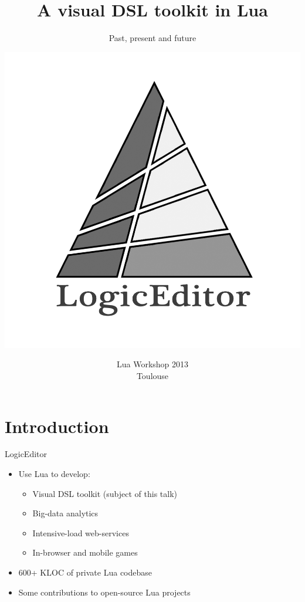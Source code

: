 \documentclass[handout]{beamer}
\title{A visual DSL toolkit in Lua}
\subtitle{Past, present and future}
\author{\includegraphics[height=.4\textheight]{logo}}
\institute{Alexander Gladysh <ag@logiceditor.com>}
\date{Lua Workshop 2013\\Toulouse}
\begin{document}
\maketitle



\section{Introduction}



\begin{frame}{LogicEditor}

\begin{itemize}
\item Use Lua to develop:
\begin{itemize}
\item Visual DSL toolkit (subject of this talk)
\item Big-data analytics
\item Intensive-load web-services
\item In-browser and mobile games
\end{itemize}
\item 600+ KLOC of private Lua codebase
\item Some contributions to open-source Lua projects
\end{itemize}

\end{frame}
\end{document}
